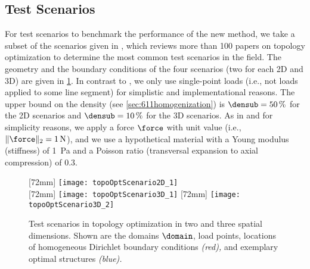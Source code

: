 \subsection{Test Scenarios}
\label{sec:632scenarios}


For test scenarios to benchmark the performance of the new method,
we take a subset of the scenarios given in \cite{Valdez17Topology},
which reviews more than 100 papers on topology optimization
to determine the most common test scenarios in the field.
The geometry and the boundary conditions of the
four scenarios (two for each 2D and 3D)
are given in \cref{fig:topoOptScenario}.
In contrast to \cite{Valdez17Topology},
we only use single-point loads
(i.e., not loads applied to some line segment)
for simplistic and implementational reasons.
The upper bound on the density (see \cref{sec:611homogenization})
is $\densub = \SI{50}{\percent}$ for the 2D scenarios and
$\densub = \SI{10}{\percent}$ for the 3D scenarios.
As in \cite{Sigmund01Line} and for simplicity reasons,
we apply a force $\force$ with unit value
(i.e., $\norm[2]{\force} = \SI{1}{\newton}$),
and we use a hypothetical material with
a Young modulus (stiffness) of \SI{1}{\pascal} and
a Poisson ratio (transversal expansion to axial compression) of $0.3$.

\begin{figure}
  [72mm]{%
    \texttt{[image: topoOptScenario2D\_1]}%
  }%
  \hfill%
  \\[7mm]%
  [72mm]{%
    \texttt{[image: topoOptScenario3D\_1]}%
  }%
  \hfill%
  [72mm]{%
    \texttt{[image: topoOptScenario3D\_2]}%
  }%
  \caption[Test scenarios in topology optimization]{%
    Test scenarios in topology optimization in
    two and three spatial dimensions.
    Shown are
    the domains $\domain$,
    load points,
    locations of homogeneous Dirichlet boundary conditions
    \emph{\textcolor{C1}{(red)},} and
    exemplary optimal structures \emph{\textcolor{C0}{(blue)}.}%
  }%
  \label{fig:topoOptScenario}%
\end{figure}

%
